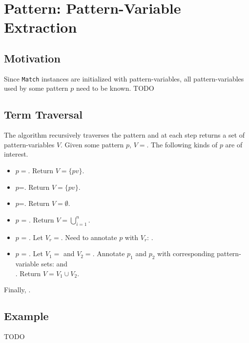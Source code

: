 \section{Pattern: Pattern-Variable Extraction}

\subsection{Motivation}
Since \texttt{Match} instances are initialized with pattern-variables, all pattern-variables used by some pattern $p$ need to be known. TODO

\subsection{Term Traversal}
The algorithm recursively traverses the pattern and at each step returns a set of pattern-variables $V$. Given some pattern $p$, $V=$. The following kinds of $p$ are of interest.

\begin{itemize}
\item $p=$\NonTerminal. Return $V = \{ pv \}$.
\item $p$=\BuiltInPattern. Return $V=\{ pv \}$.
\item $p$=\LiteralPattern. Return $V=\emptyset$.
\item $p$ = \PatternSequence. Return $V=\bigcup_{i=1}^{n}$.
\item $p$ = \PatternRepeat. Let $V_r=$. Need to annotate $p$ with $V_r$: .
\item $p$ = \PatternInHole. Let $V_1=$ and  $V_2=$. Annotate $p_1$ and $p_2$ with corresponding pattern-variable sets:  and \\ . Return $V = V_1 \cup V_2$.
\end{itemize}

Finally, .

\subsection{Example}
TODO
